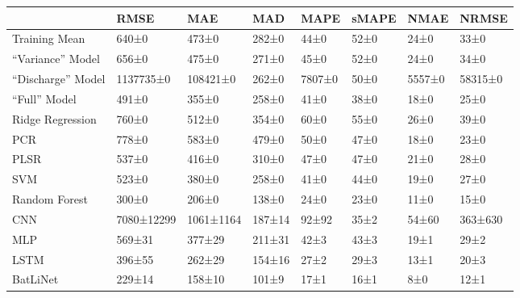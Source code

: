 \begin{tabular}{llllllll}
\toprule
 & RMSE & MAE & MAD & MAPE & sMAPE & NMAE & NRMSE \\
\midrule
Training Mean & 640±0 & 473±0 & 282±0 & 44±0 & 52±0 & 24±0 & 33±0 \\
``Variance'' Model & 656±0 & 475±0 & 271±0 & 45±0 & 52±0 & 24±0 & 34±0 \\
``Discharge'' Model & 1137735±0 & 108421±0 & 262±0 & 7807±0 & 50±0 & 5557±0 & 58315±0 \\
``Full'' Model & 491±0 & 355±0 & 258±0 & 41±0 & 38±0 & 18±0 & 25±0 \\
Ridge Regression & 760±0 & 512±0 & 354±0 & 60±0 & 55±0 & 26±0 & 39±0 \\
PCR & 778±0 & 583±0 & 479±0 & 50±0 & 47±0 & 18±0 & 23±0 \\
PLSR & 537±0 & 416±0 & 310±0 & 47±0 & 47±0 & 21±0 & 28±0 \\
SVM & 523±0 & 380±0 & 258±0 & 41±0 & 44±0 & 19±0 & 27±0 \\
Random Forest & 300±0 & 206±0 & 138±0 & 24±0 & 23±0 & 11±0 & 15±0 \\
CNN & 7080±12299 & 1061±1164 & 187±14 & 92±92 & 35±2 & 54±60 & 363±630 \\
MLP & 569±31 & 377±29 & 211±31 & 42±3 & 43±3 & 19±1 & 29±2 \\
LSTM & 396±55 & 262±29 & 154±16 & 27±2 & 29±3 & 13±1 & 20±3 \\
BatLiNet & 229±14 & 158±10 & 101±9 & 17±1 & 16±1 & 8±0 & 12±1 \\
\bottomrule
\end{tabular}
